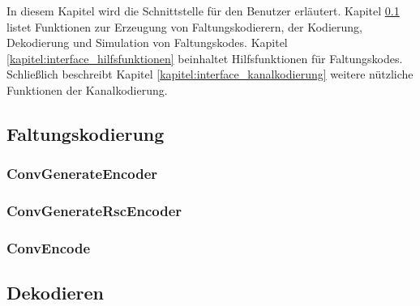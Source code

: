 
In diesem Kapitel wird die Schnittstelle für den Benutzer erläutert. Kapitel \ref{kapitel:interface_faltungskodierung} listet Funktionen zur Erzeugung von Faltungskodierern, der Kodierung, Dekodierung und Simulation von Faltungskodes. Kapitel \ref{kapitel:interface_hilfsfunktionen} beinhaltet Hilfsfunktionen für Faltungskodes. Schließlich beschreibt Kapitel \ref{kapitel:interface_kanalkodierung} weitere nützliche Funktionen der Kanalkodierung.

\subsection{Faltungskodierung}
\label{kapitel:interface_faltungskodierung}

\subsubsection{ConvGenerateEncoder}


\subsubsection{ConvGenerateRscEncoder}


\subsubsection{ConvEncode}


\subsection{Dekodieren}
\label{kapitel:interface_dekodieren}

